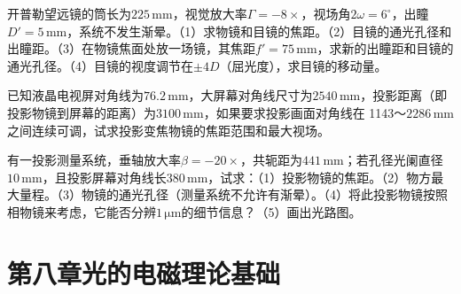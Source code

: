 \documentclass[standard, analysis, notocnum]{ExBook}
\newcommand{\answerarea}[1][8cm]{%
  \par\vspace{2mm}%
  \noindent{\color{themeColor!35}\rule{\linewidth}{0.4pt}}\par
  \noindent\begin{minipage}[t][#1][t]{\linewidth}\vspace{0pt}\end{minipage}\par
  \noindent{\color{themeColor!35}\rule{\linewidth}{0.4pt}}\par
}
\begin{document}
\begin{qitems}[startnum=9]
\qitem 开普勒望远镜的筒长为$225\,\mathrm{mm}$，视觉放大率$\Gamma =-8\times$，视场角$2\omega =6^{\circ}$，出瞳$D'=5\,\mathrm{mm}$，系统不发生渐晕。（1）求物镜和目镜的焦距。（2）目镜的通光孔径和出瞳距。（3）在物镜焦面处放一场镜，其焦距$f'=75\,\mathrm{mm}$，求新的出瞳距和目镜的通光孔径。（4）目镜的视度调节在$\pm 4D$（屈光度），求目镜的移动量。
\label{q:148:start}
\answerarea[8cm]
\label{q:148:end}
\end{qitems}

\begin{qitems}[startnum=10]
\qitem 已知液晶电视屏对角线为$76.2\,\mathrm{mm}$，大屏幕对角线尺寸为$2540\,\mathrm{mm}$，投影距离（即投影物镜到屏幕的距离）为$3100\,\mathrm{mm}$，如果要求投影画面对角线在 1143～$2286\,\mathrm{mm}$之间连续可调，试求投影变焦物镜的焦距范围和最大视场。
\label{q:149:start}
\answerarea[8cm]
\label{q:149:end}
\end{qitems}

\begin{qitems}[startnum=11]
\qitem 有一投影测量系统，垂轴放大率$\beta =-20\times$，共轭距为$441\,\mathrm{mm}$；若孔径光阑直径$10\,\mathrm{mm}$，且投影屏幕对角线长$380\,\mathrm{mm}$，试求：（1）投影物镜的焦距。（2）物方最大量程。（3）物镜的通光孔径（测量系统不允许有渐晕）。（4）将此投影物镜按照相物镜来考虑，它能否分辨$1\,\mathrm{\mu m}$的细节信息？（5）画出光路图。
\label{q:150:start}
\answerarea[8cm]
\label{q:150:end}
\end{qitems}

\section{第八章\quad 光的电磁理论基础}
\end{document}
